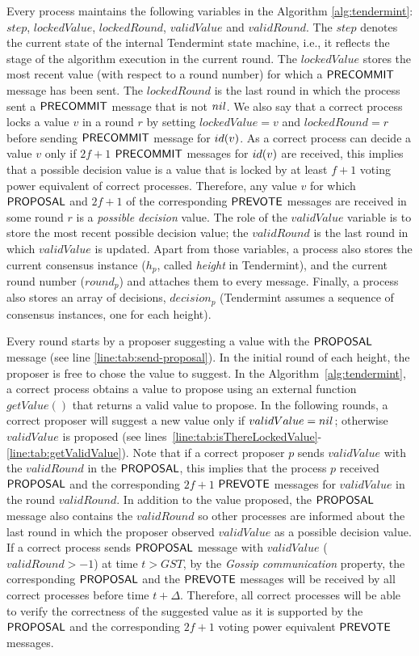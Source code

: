 Every process maintains the following variables in the Algorithm
\ref{alg:tendermint}: $step$, $lockedValue$, $lockedRound$, $validValue$ and
$validRound$. The $step$ denotes the current state of the internal Tendermint
state machine, i.e., it reflects the stage of the algorithm execution in the
current round. The $lockedValue$ stores the most recent value (with respect to
a round number) for which a $\mathsf{PRECOMMIT}$ message has been sent. The
$lockedRound$ is the last round in which the process sent a $\mathsf{PRECOMMIT}$
message that is not $nil$. We also say that a correct process locks a value
$v$ in a round $r$ by setting $lockedValue = v$ and $lockedRound = r$ before
sending $\mathsf{PRECOMMIT}$ message for $id(v)$. As a correct process can decide a
value $v$ only if $2f+1$ $\mathsf{PRECOMMIT}$ messages for $id(v)$ are received, this
implies that a possible decision value is a value that is locked by at least
$f+1$ voting power equivalent of correct processes. Therefore, any value $v$
for which $\mathsf{PROPOSAL}$ and $2f+1$ of the corresponding $\mathsf{PREVOTE}$ messages are
received in some round $r$ is a \emph{possible decision} value. The role of the
$validValue$ variable is to store the most recent possible decision value; the
$validRound$ is the last round in which $validValue$ is updated. Apart from
those variables, a process also stores the current consensus instance ($h_p$,
called \emph{height} in Tendermint), and the current round number ($round_p$)
and attaches them to every message. Finally, a process also stores an array of
decisions, $decision_p$ (Tendermint assumes a sequence of consensus instances,
one for each height).

Every round starts by a proposer suggesting a value with the $\mathsf{PROPOSAL}$
message (see line \ref{line:tab:send-proposal}). In the initial round of each
height, the proposer is free to chose the value to suggest. In the
Algorithm~\ref{alg:tendermint}, a correct process obtains a value to propose
using an external function    $getValue()$ that returns a valid value to
propose. In the following rounds, a correct proposer will suggest a new value
only if $validValue = nil$; otherwise $validValue$ is proposed (see
lines~\ref{line:tab:isThereLockedValue}-\ref{line:tab:getValidValue}). Note
that if a correct proposer $p$ sends $validValue$ with the $validRound$ in the
$\mathsf{PROPOSAL}$, this implies that the process $p$ received $\mathsf{PROPOSAL}$ and the
corresponding $2f+1$ $\mathsf{PREVOTE}$ messages for $validValue$ in the round
$validRound$. In addition to the value proposed, the $\mathsf{PROPOSAL}$ message also
contains the $validRound$ so other processes are informed about the last round
in which the proposer observed $validValue$ as a possible decision value.  If a
correct process sends $\mathsf{PROPOSAL}$ message with $validValue$ ($validRound > -1$)
at time $t > GST$, by the \emph{Gossip communication} property, the
corresponding $\mathsf{PROPOSAL}$ and the $\mathsf{PREVOTE}$ messages will be received by all
correct processes before time $t+\Delta$. Therefore, all correct processes will
be able to verify the correctness of the suggested value as it is supported by the
$\mathsf{PROPOSAL}$ and the corresponding $2f+1$ voting power equivalent $\mathsf{PREVOTE}$
messages.   

